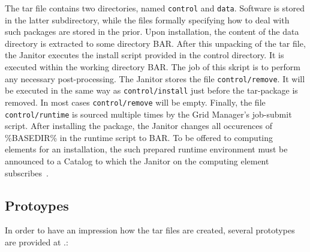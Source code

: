 The tar file contains two directories, named {\tt control} and {\tt data}. Software is stored in the latter subdirectory,
while the files formally specifying how to deal with such packages are stored in the prior. Upon installation,
the content of the data directory is extracted to some directory \textdollar BAR. 
After this unpacking of the tar file, the Janitor executes the install script provided in the control directory. 
It is executed within the working directory \textdollar BAR. The job of this skript is to perform any necessary post-processing.
The Janitor stores the file \texttt{control/remove}. It will be executed in the same way as \texttt{control/install} just
before the tar-package is removed. In most cases \texttt{control/remove} will be empty.
Finally, the file \texttt{control/runtime} is sourced multiple times by the Grid Manager's job-submit script. After
installing the package, the Janitor changes all occurences of \%BASEDIR\% in the runtime script to \textdollar BAR.
To be offered to computing elements for an installation, the such prepared runtime environment must be
announced to a Catalog to which the Janitor on the computing element subscribes~\cite[p. 10]{BAYER_2007}.



\subsection{Protoypes}

In order to have an impression how the tar files are created, several prototypes are provided at .:\\


